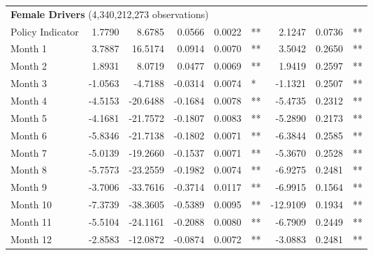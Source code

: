 \begin{table}
\begin{tabular}{l r r r r l r r l}
\hline 

\multicolumn{7}{l}{\textbf{Female Drivers} (4,340,212,273 observations)} \\ 

Policy Indicator          &  1.7790        &  8.6785       &  0.0566        &  0.0022       &   **       &  2.1247        &  0.0736       &   **       \\ 
Month 1                         &  3.7887        &  16.5174       &  0.0914        &  0.0070       &   **       &  3.5042        &  0.2650       &   **       \\ 
Month 2                         &  1.8931        &  8.0719       &  0.0477        &  0.0069       &   **       &  1.9419        &  0.2597       &   **       \\ 
Month 3                         &  -1.0563        &  -4.7188       &  -0.0314        &  0.0074       &    *       &  -1.1321        &  0.2507       &   **       \\ 
Month 4                         &  -4.5153        &  -20.6488       &  -0.1684        &  0.0078       &   **       &  -5.4735        &  0.2312       &   **       \\ 
Month 5                         &  -4.1681        &  -21.7572       &  -0.1807        &  0.0083       &   **       &  -5.2890        &  0.2173       &   **       \\ 
Month 6                         &  -5.8346        &  -21.7138       &  -0.1802        &  0.0071       &   **       &  -6.3844        &  0.2585       &   **       \\ 
Month 7                         &  -5.0139        &  -19.2660       &  -0.1537        &  0.0071       &   **       &  -5.3670        &  0.2528       &   **       \\ 
Month 8                         &  -5.7573        &  -23.2559       &  -0.1982        &  0.0074       &   **       &  -6.9275        &  0.2481       &   **       \\ 
Month 9                         &  -3.7006        &  -33.7616       &  -0.3714        &  0.0117       &   **       &  -6.9915        &  0.1564       &   **       \\ 
Month 10                        &  -7.3739        &  -38.3605       &  -0.5389        &  0.0095       &   **       &  -12.9109        &  0.1934       &   **       \\ 
Month 11                        &  -5.5104        &  -24.1161       &  -0.2088        &  0.0080       &   **       &  -6.7909        &  0.2449       &   **       \\ 
Month 12                        &  -2.8583        &  -12.0872       &  -0.0874        &  0.0072       &   **       &  -3.0883        &  0.2481       &   **       \\ 


\end{tabular}
\end{table}
